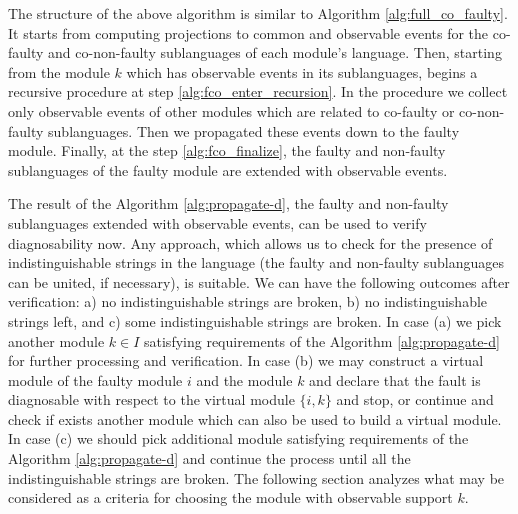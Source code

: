 \documentclass[a4paper, 10pt, conference]{ieeeconf}
\begin{document}
The structure of the above algorithm is similar to Algorithm
\ref{alg:full_co_faulty}. It starts from computing projections to common and
observable events for the co-faulty and co-non-faulty sublanguages of each
module's language. Then, starting from the module $k$ which has observable
events in its sublanguages, begins a recursive procedure at step
\ref{alg:fco_enter_recursion}. In the procedure we collect only observable
events of other modules which are related to co-faulty or co-non-faulty
sublanguages. Then we propagated these events down to the faulty module.
Finally, at the step \ref{alg:fco_finalize}, the faulty and non-faulty
sublanguages of the faulty module are extended with observable events.

The result of the Algorithm \ref{alg:propagate-d}, the faulty and non-faulty
sublanguages extended with observable events, can be used to verify
diagnosability now. Any approach, which allows us to check for the presence of
indistinguishable strings in the language (the faulty and non-faulty
sublanguages can be united, if necessary), is suitable. We can have the
following outcomes after verification: a) no indistinguishable strings are
broken, b) no indistinguishable strings left, and c) some indistinguishable
strings are broken. In case (a) we pick another module $k \in I$ satisfying
requirements of the Algorithm \ref{alg:propagate-d} for further processing and
verification. In case (b) we may construct a virtual module of the faulty module
$i$ and the module $k$ and declare that the fault is diagnosable with respect to
the virtual module $\{i, k\}$ and stop, or continue and check if exists another
module which can also be used to build a virtual module. In case (c) we should
pick additional module satisfying requirements of the Algorithm
\ref{alg:propagate-d} and continue the process until all the indistinguishable
strings are broken. The following section analyzes what may be considered as a
criteria for choosing the module with observable support $k$.
\end{document}
